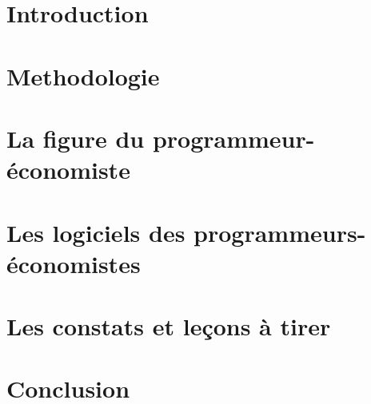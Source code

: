\documentclass[a4paper,12pt,twoside,french]{book}
\begin{document}
\renewcommand{\chaptermark}[1]{\markboth{#1}{}}





\mainmatter
\setlength{\parskip}{1.2em}

\renewcommand{\baselinestretch}{1.1} %

\fancyhead[RO]{\leftmark}
\fancyhead[LE]{\textsc{\chaptername~\thechapter}}

\tableofcontents

\chapter*{Introduction}


\chapter*{Methodologie}


\chapter{La figure du programmeur-économiste} %


\chapter{Les logiciels des programmeurs-économistes}


\chapter{Les constats et leçons à tirer}


\chapter*{Conclusion}




\printbibliography
\end{document}
